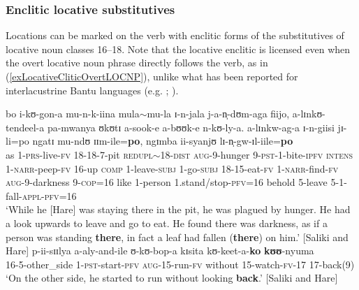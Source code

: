 \subsubsection{Enclitic locative substitutives}\label{LocativeEnclitics}
Locations can be marked on the verb with enclitic forms of the substitutives of locative noun classes 16--18. Note that the locative enclitic is licensed even when the overt locative noun phrase directly follows the verb, as in (\ref{exLocativeCliticOvertLOCNP}), unlike what has been reported for interlacustrine Bantu languages (e.g. \citealt{DiercksM2011}; \citealt{GrayH2013}).
\begin{exe}
	\ex \gll bo i-kʊ-gon-a mu-n-k-iina mula$\sim$mu-la ɪ-n-jala j-a-n̩-dʊm-aga fiijo, a-lɪnkʊ-tendeel-a pa-mwanya ʊkʊtɪ a-sook-e a-bʊʊk-e n-kʊ-ly-a. a-lɪnkw-ag-a ɪ-n-giisi jɪ-li=po ngatɪ mu-ndʊ ɪɪm-ile=\textbf{po}, ngɪmba ii-syanjʊ lɪ-n̩-gw-ɪl-iile=\textbf{po}\\
	as 1-\textsc{prs}-live-\textsc{fv} 18-18-7-pit \textsc{redupl}$\sim$18-\textsc{dist} \textsc{aug}-9-hunger 9-\textsc{pst}-1-bite-\textsc{ipfv} \textsc{intens} 1-\textsc{narr}-peep-\textsc{fv} 16-up \textsc{comp} 1-leave-\textsc{subj} 1-go-\textsc{subj} 18-15-eat-\textsc{fv} 1-\textsc{narr}-find-\textsc{fv} \textsc{aug}-9-darkness 9-\textsc{cop}=16 like 1-person 1.stand/stop-\textsc{pfv}=16 behold 5-leave 5-1-fall-\textsc{appl}-\textsc{pfv}=16\\
	\glt `While he [Hare] was staying there in the pit, he was plagued by hunger. He had a look upwards to leave and go to eat. He found there was darkness, as if a person was standing \textbf{there}, in fact a leaf had fallen (\textbf{there}) on him.' [Saliki and Hare]
	\ex \label{exLocativeCliticOvertLOCNP}
	\gll p-ii-sɪɪlya a-aly-and-ile ʊ-kʊ-bop-a kɪsita kʊ-keet-a-\textbf{ko} \textbf{kʊʊ}-nyuma\\
	16-5-other\_side 1-\textsc{pst}-start-\textsc{pfv} \textsc{aug}-15-run-\textsc{fv} without 15-watch-\textsc{fv}-17 17-back(9)\\
	\glt \lq On the other side, he started to run without looking \textbf{back}.' [Saliki and Hare]

\end{exe}

